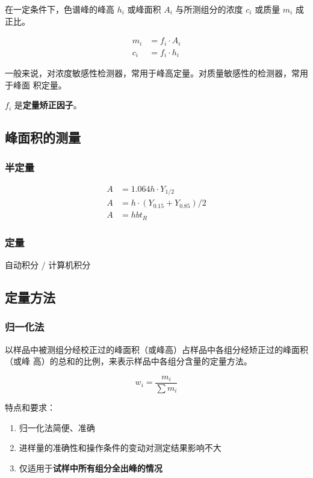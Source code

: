 在一定条件下，色谱峰的峰高 $h_i$ 或峰面积 $A_i$ 与所测组分的浓度 $c_i$ 或质量
$m_i$ 成正比。

\begin{align}
    m_i & = f_i \cdot A_i \\
    c_i & = f_i \cdot h_i
\end{align}

一般来说，对浓度敏感性检测器，常用于峰高定量。对质量敏感性的检测器，常用于峰面
积定量。

$f_i$ 是\textbf{定量矫正因子}。

\subsection{峰面积的测量}

\subsubsection{半定量}

\begin{align}
    A & = 1.064 h \cdot Y_{1/2}             \\
    A & = h \cdot (Y_{0.15} + Y_{0.85}) / 2 \\
    A & = h b t_R
\end{align}

\subsubsection{定量}

自动积分 / 计算机积分

\subsection{定量方法}

\subsubsection{归一化法}

以样品中被测组分经校正过的峰面积（或峰高）占样品中各组分经矫正过的峰面积（或峰
高）的总和的比例，来表示样品中各组分含量的定量方法。

\begin{equation}
    w_i = \frac{m_i}{\sum m_i}
\end{equation}

特点和要求：

\begin{enumerate}
    \item 归一化法简便、准确
    \item 进样量的准确性和操作条件的变动对测定结果影响不大
    \item 仅适用于\textbf{试样中所有组分全出峰的情况}
\end{enumerate}

